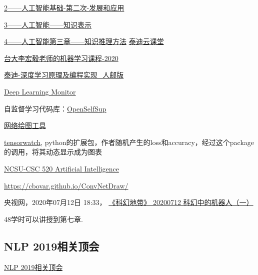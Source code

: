 \begin{pre}
\href{https://ke.qq.com/webcourse/index.html?cid=1086628&term_id=101182654&lite=1&from=800021724#taid=8423279&vid=5285890799803709554}{2——人工智能基础-第二次-发展和应用}

\href{https://github.com/zggl/AITeachingPlanDraft2020/blob/master/3-\%E4\%BA\%BA\%E5\%B7\%A5\%E6\%99\%BA\%E8\%83\%BD\%E7\%AC\%AC\%E4\%BA\%8C\%E7\%AB\%A0\%E7\%AC\%AC\%E4\%B8\%80\%E6\%AC\%A1\%E5\%B9\%BB\%E7\%81\%AF\%20\%E4\%BA\%BA\%E5\%B7\%A5\%E6\%99\%BA\%E8\%83\%BD\%E7\%9A\%84\%E7\%9F\%A5\%E8\%AF\%86\%E8\%A1\%A8\%E7\%A4\%BA.pdf}{3——人工智能——知识表示}

\href{https://github.com/zggl/AITeachingPlanDraft2020/blob/master/4-\%E4\%BA\%BA\%E5\%B7\%A5\%E6\%99\%BA\%E8\%83\%BD\%E7\%AC\%AC\%E4\%B8\%89\%E7\%AB\%A0\%E7\%AC\%AC\%E4\%B8\%80\%E6\%AC\%A1\%20\%E4\%BA\%BA\%E5\%B7\%A5\%E6\%99\%BA\%E8\%83\%BD\%E7\%9A\%84\%E7\%9F\%A5\%E8\%AF\%86\%E6\%8E\%A8\%E7\%90\%86\%E6\%96\%B9\%E6\%B3\%95.pdf}{4——人工智能第三章——知识推理方法}
\href{https://edu.tipdm.org/notification?id=32302}{泰迪云课堂}

\href{http://speech.ee.ntu.edu.tw/~tlkagk/courses_ML20.html}{台大李宏毅老师的机器学习课程-2020}

\href{https://edu.tipdm.org/classroom/122/courses}{泰迪-深度学习原理及编程实现\_人邮版}

\href{https://deeplearn.org/}{Deep Learning Monitor}

自监督学习代码库：\href{https://github.com/open-mmlab/OpenSelfSup}{OpenSelfSup}

\href{http://alexlenail.me/NN-SVG/}{网络绘图工具}

\href{https://github.com/microsoft/tensorwatch}{tensorwatch}, python的扩展包，作者随机产生的loss和accuracy，经过这个package的调用，将其动态显示成为图表

\href{https://www.engineeringonline.ncsu.edu/course/csc-520-artificial-intelligence-i/}{NCSU-CSC 520 Artificial Intelligence}

\href{ConvNetDraw（卷积神经网络）,配置命令的CNN神经网络画图工具，开发者是香港的一位程序员。}{https://cbovar.github.io/ConvNetDraw/}

央视网，2020年07月12日 18:33， \href{https://tv.cctv.com/2020/07/12/VIDE97wmdEMDFTuh2C9XaSOL200712.shtml?spm=C53121759377.Pxm23GSMKB13.0.0}{《科幻地带》 20200712 科幻中的机器人（一）}


48学时可以讲授到第七章.
\subsection{NLP 2019相关顶会}
\href{https://github.com/zggl/NLP-Conferences-Code}{NLP 2019相关顶会}


\end{pre}
